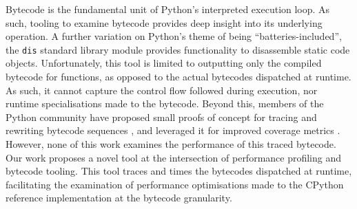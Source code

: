 Bytecode is the fundamental unit of Python's interpreted execution loop. As such, tooling to examine bytecode provides deep insight into its underlying operation.
A further variation on Python's theme of being ``batteries-included'', the \texttt{dis} standard library module provides functionality to disassemble static code objects. Unfortunately, this tool is limited to outputting only the compiled bytecode for functions, as opposed to the actual bytecodes dispatched at runtime. As such, it cannot capture the control flow followed during execution, nor runtime specialisations made to the bytecode.
Beyond this, members of the Python community have proposed small proofs of concept for tracing and rewriting bytecode sequences \cite{0xecCodingReversingHacking2017} \cite{clementrouaultUnderstandingPythonExecution}, and leveraged it for improved coverage metrics \cite{nedbatchelderWickedHackPython2008}.
However, none of this work examines the performance of this traced bytecode.
Our work proposes a novel tool at the intersection of performance profiling and bytecode tooling.
This tool traces and times the bytecodes dispatched at runtime, facilitating the examination of performance optimisations made to the CPython reference implementation at the bytecode granularity.
